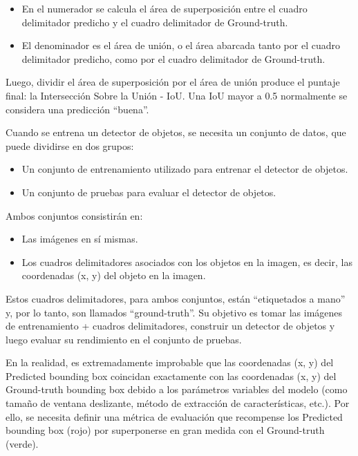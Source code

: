 \newpage
\begin{itemize}
    \item En el numerador se calcula el  área de superposición entre el cuadro delimitador predicho y el cuadro delimitador de Ground-truth.
    \item El denominador es el  área de unión, o el área abarcada tanto por el cuadro delimitador predicho, como por el cuadro delimitador de Ground-truth.
\end{itemize}

Luego, dividir el área de superposición por el área de unión produce el puntaje final:  la Intersección Sobre la Unión - IoU. Una IoU mayor a 0.5 normalmente se considera una predicción ``buena''.

Cuando se entrena un detector de objetos, se necesita un conjunto de datos, que puede dividirse en dos grupos:

\begin{itemize}
    \item Un conjunto de entrenamiento utilizado para entrenar el detector de objetos.
    \item Un conjunto de pruebas para evaluar el detector de objetos.
\end{itemize}

Ambos conjuntos consistirán en:

\begin{itemize}
    \item Las imágenes en sí mismas.
    \item Los  cuadros delimitadores asociados con los objetos en la imagen, es decir, las coordenadas (x, y) del objeto en la imagen.
\end{itemize}

Estos cuadros delimitadores, para ambos conjuntos, están ``etiquetados a mano'' y, por lo tanto, son llamados ``ground-truth''. Su objetivo es tomar las imágenes de entrenamiento + cuadros delimitadores, construir un detector de objetos y luego evaluar su rendimiento en el conjunto de pruebas.

En la realidad, es  extremadamente  improbable que las  coordenadas (x, y) del Predicted bounding box coincidan exactamente con las coordenadas (x, y) del Ground-truth bounding box debido a los parámetros variables del modelo (como tamaño de ventana deslizante, método de extracción de características, etc.). Por ello, se necesita definir una métrica de evaluación que recompense los Predicted bounding box (rojo) por superponerse en gran medida con el Ground-truth (verde). 

